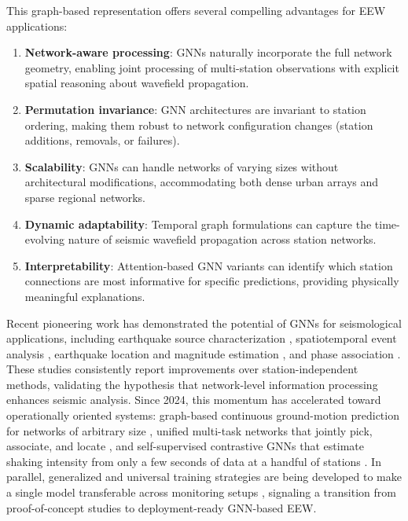 \documentclass[review,authoryear]{elsarticle}
\begin{document}
This graph-based representation offers several compelling advantages for EEW applications:

\begin{enumerate}[label=(\roman*)]
  \item \textbf{Network-aware processing}: GNNs naturally incorporate the full network geometry, enabling joint processing of multi-station observations with explicit spatial reasoning about wavefield propagation.
  \item \textbf{Permutation invariance}: GNN architectures are invariant to station ordering, making them robust to network configuration changes (station additions, removals, or failures).
  \item \textbf{Scalability}: GNNs can handle networks of varying sizes without architectural modifications, accommodating both dense urban arrays and sparse regional networks.
  \item \textbf{Dynamic adaptability}: Temporal graph formulations can capture the time-evolving nature of seismic wavefield propagation across station networks.
  \item \textbf{Interpretability}: Attention-based GNN variants can identify which station connections are most informative for specific predictions, providing physically meaningful explanations.
\end{enumerate}

Recent pioneering work has demonstrated the potential of GNNs for seismological applications, including earthquake source characterization \citep{vandenende2020automated}, spatiotemporal event analysis \citep{zhang2021spatiotemporal}, earthquake location and magnitude estimation \citep{mcbrearty2023earthquake}, and phase association \citep{munchmeyer2021gnn, mcbrearty2023genie}. These studies consistently report improvements over station-independent methods, validating the hypothesis that network-level information processing enhances seismic analysis. Since 2024, this momentum has accelerated toward operationally oriented systems: graph-based continuous ground-motion prediction for networks of arbitrary size \citep{clements2024grapes}, unified multi-task networks that jointly pick, associate, and locate \citep{si2024plan}, and self-supervised contrastive GNNs that estimate shaking intensity from only a few seconds of data at a handful of stations \citep{murshed2024scgnn}. In parallel, generalized and universal training strategies are being developed to make a single model transferable across monitoring setups \citep{zhang2024universal}, signaling a transition from proof-of-concept studies to deployment-ready GNN-based EEW.
\end{document}
